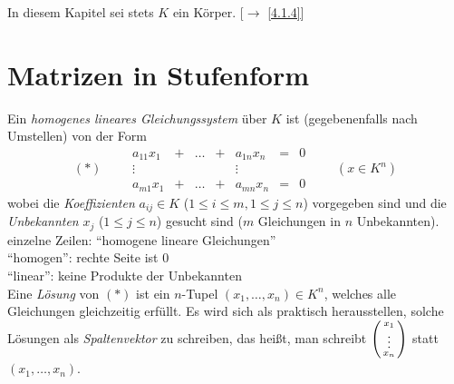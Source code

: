 \documentclass[../../main.tex]{subfiles}
\begin{document}
In diesem Kapitel sei stets $K$ ein Körper. [$\to$ \ref{4.1.4}]

\section{Matrizen in Stufenform}\label{5.1}

\begin{spr}\label{5.1.1}
Ein \emph{homogenes lineares Gleichungssystem} über $K$ ist (gegebenenfalls nach Umstellen) von der Form
$$
(*)\qquad
\begin{array}{cccccccc}
a_{11}x_1&+&\ldots&+&a_{1n} x_n &=& 0\\
\vdots && && \vdots &&\\
a_{m1}x_1&+&\ldots&+&a_{mn} x_n&=&0
\end{array}
\qquad(x\in K^n)
$$
wobei die \emph{Koeffizienten} $a_{ij}\in K$ ($1\leq i\leq m,1\leq j\leq n$) vorgegeben sind und die \emph{Unbekannten} $x_j$ ($1\leq j\leq n$) gesucht sind ($m$ Gleichungen in $n$ Unbekannten).\\
einzelne Zeilen: "`homogene lineare Gleichungen"'\\
"`homogen"': rechte Seite ist $0$\\
"`linear"': keine Produkte der Unbekannten\\
Eine \emph{Lösung} von $(*)$ ist ein $n$-Tupel $(x_1,\ldots,x_n)\in K^n$, welches alle Gleichungen gleichzeitig erfüllt. Es wird sich als praktisch herausstellen, solche Lösungen als \emph{Spaltenvektor} zu schreiben, das heißt, man schreibt $\left(\begin{smallmatrix}x_1\\\vdots\\x_n\end{smallmatrix}\right)$ statt $(x_1,\ldots,x_n)$.
\end{spr}
\end{document}
